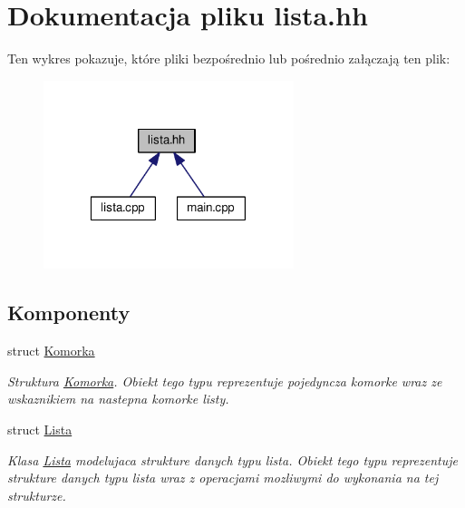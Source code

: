 \hypertarget{lista_8hh}{\section{Dokumentacja pliku lista.\-hh}
\label{lista_8hh}
}
Ten wykres pokazuje, które pliki bezpośrednio lub pośrednio załączają ten plik\-:\nopagebreak
\begin{figure}[H]
\begin{center}
\leavevmode
\includegraphics[width=207pt]{lista_8hh__dep__incl}
\end{center}
\end{figure}
\subsection*{Komponenty}
\begin{DoxyCompactItemize}
\item 
struct \hyperlink{struct_komorka}{Komorka}
\begin{DoxyCompactList}\small\item\em Struktura \hyperlink{struct_komorka}{Komorka}. Obiekt tego typu reprezentuje pojedyncza komorke wraz ze wskaznikiem na nastepna komorke listy. \end{DoxyCompactList}\item 
struct \hyperlink{struct_lista}{Lista}
\begin{DoxyCompactList}\small\item\em Klasa \hyperlink{struct_lista}{Lista} modelujaca strukture danych typu lista. Obiekt tego typu reprezentuje strukture danych typu lista wraz z operacjami mozliwymi do wykonania na tej strukturze. \end{DoxyCompactList}\end{DoxyCompactItemize}
